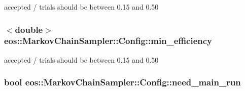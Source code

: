 accepted / trials should be between 0.15 and 0.50 \hypertarget{classeos_1_1MarkovChainSampler_1_1Config_a0d907985d270035dbc3fc2235667ed0e}{
\subsubsection[{min\_\-efficiency}]{$<$double$>$ {\bf eos::MarkovChainSampler::Config::min\_\-efficiency}}}
\label{classeos_1_1MarkovChainSampler_1_1Config_a0d907985d270035dbc3fc2235667ed0e}


accepted / trials should be between 0.15 and 0.50 \hypertarget{classeos_1_1MarkovChainSampler_1_1Config_a1efc4d04039ba60a1f4c27ae28fe1554}{
\subsubsection[{need\_\-main\_\-run}]{\setlength{\rightskip}{0pt plus 5cm}bool {\bf eos::MarkovChainSampler::Config::need\_\-main\_\-run}}}
\label{classeos_1_1MarkovChainSampler_1_1Config_a1efc4d04039ba60a1f4c27ae28fe1554}


